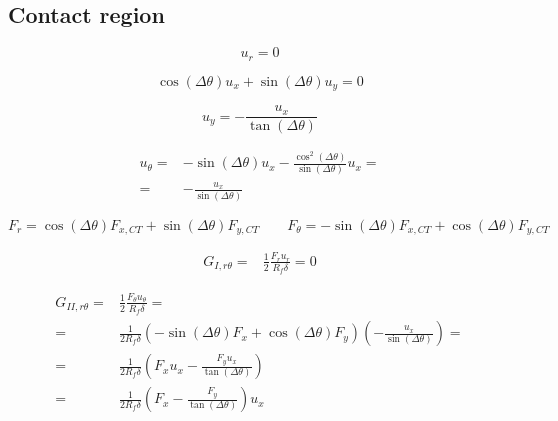 \documentclass[a4paper]{jpconf}
\begin{document}
\subsection{Contact region}

\begin{equation}
u_{r}=0
\end{equation}

\begin{equation}
\cos\left(\Delta\theta\right) u_{x}+\sin\left(\Delta\theta\right) u_{y}=0
\end{equation}

\begin{equation}
u_{y}=-\frac{ u_{x}}{\tan\left(\Delta\theta\right)}
\end{equation}

\begin{equation}
\begin{split}
u_{\theta}=&-\sin\left(\Delta\theta\right) u_{x}-\frac{\cos^{2}\left(\Delta\theta\right)}{\sin\left(\Delta\theta\right)}u_{x}=\\
=&-\frac{u_{x}}{\sin\left(\Delta\theta\right)}
\end{split}
\end{equation}

\begin{equation}
F_{r}=\cos\left(\Delta\theta\right) F_{x,CT}+\sin\left(\Delta\theta\right) F_{y,CT}\qquad F_{\theta}=-\sin\left(\Delta\theta\right) F_{x,CT}+\cos\left(\Delta\theta\right) F_{y,CT}
\end{equation}

\begin{equation}
\begin{split}
G_{I,r\theta} = &\frac{1}{2}\frac{F_{r}u_{r}}{R_{f}\delta}=0
\end{split}
\end{equation}

\begin{equation}
\begin{split}
G_{II,r\theta} = &\frac{1}{2}\frac{F_{\theta}u_{\theta}}{R_{f}\delta}=\\
= &\frac{1}{2R_{f}\delta}\left(-\sin\left(\Delta\theta\right) F_{x}+\cos\left(\Delta\theta\right)F_{y}\right)\left(-\frac{u_{x}}{\sin\left(\Delta\theta\right)}\right)=\\
= &\frac{1}{2R_{f}\delta}\left( F_{x}u_{x}-\frac{F_{y}u_{x}}{\tan\left(\Delta\theta\right)}\right)\\
= &\frac{1}{2R_{f}\delta}\left( F_{x}-\frac{F_{y}}{\tan\left(\Delta\theta\right)}\right)u_{x}\\
\end{split}
\end{equation}
\end{document}
